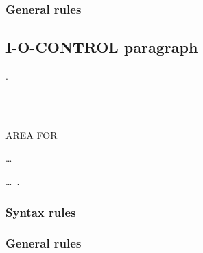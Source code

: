 \subsubsection{General rules}

\subsection{I-O-CONTROL paragraph}
\begin{syntax}
  \begin{0-1}
    .
  \end{0-1}\newline
  \begin{1=}
    \begin{0-1}
       \\
       \\
    \end{0-1}
    AREA FOR
    \begin{1=}
      \filename
    \end{1=}\ldots \\

  \end{1=}\ldots\ {}.
\end{syntax}

\subsubsection{Syntax rules}

\subsubsection{General rules}

